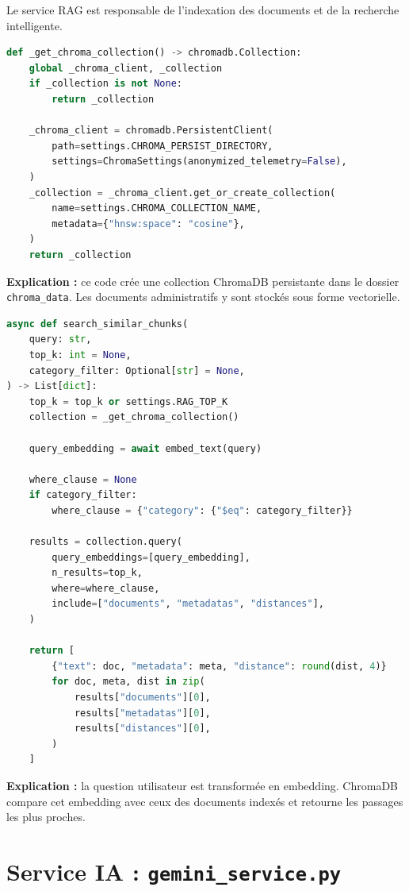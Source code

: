 \documentclass[12pt,a4paper]{report}
\begin{document}
Le service RAG est responsable de l'indexation des documents et de la recherche intelligente.

\begin{lstlisting}[language=Python,caption={Initialisation de ChromaDB}]
def _get_chroma_collection() -> chromadb.Collection:
    global _chroma_client, _collection
    if _collection is not None:
        return _collection

    _chroma_client = chromadb.PersistentClient(
        path=settings.CHROMA_PERSIST_DIRECTORY,
        settings=ChromaSettings(anonymized_telemetry=False),
    )
    _collection = _chroma_client.get_or_create_collection(
        name=settings.CHROMA_COLLECTION_NAME,
        metadata={"hnsw:space": "cosine"},
    )
    return _collection
\end{lstlisting}

\textbf{Explication :} ce code crée une collection ChromaDB persistante dans le dossier \texttt{chroma\_data}. Les documents administratifs y sont stockés sous forme vectorielle.

\begin{lstlisting}[language=Python,caption={Recherche de documents similaires}]
async def search_similar_chunks(
    query: str,
    top_k: int = None,
    category_filter: Optional[str] = None,
) -> List[dict]:
    top_k = top_k or settings.RAG_TOP_K
    collection = _get_chroma_collection()

    query_embedding = await embed_text(query)

    where_clause = None
    if category_filter:
        where_clause = {"category": {"$eq": category_filter}}

    results = collection.query(
        query_embeddings=[query_embedding],
        n_results=top_k,
        where=where_clause,
        include=["documents", "metadatas", "distances"],
    )

    return [
        {"text": doc, "metadata": meta, "distance": round(dist, 4)}
        for doc, meta, dist in zip(
            results["documents"][0],
            results["metadatas"][0],
            results["distances"][0],
        )
    ]
\end{lstlisting}

\textbf{Explication :} la question utilisateur est transformée en embedding. ChromaDB compare cet embedding avec ceux des documents indexés et retourne les passages les plus proches.

\section{Service IA : \texttt{gemini\_service.py}}
\end{document}
